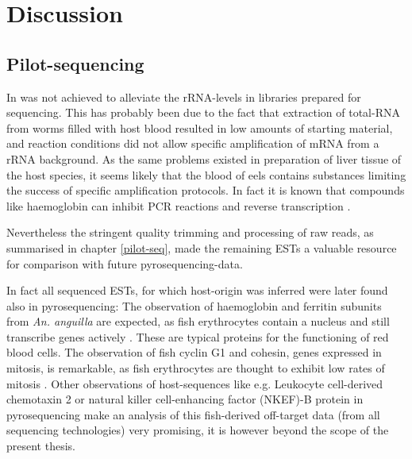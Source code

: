 
\chapter{Discussion} %



\ifpdf
    \graphicspath{{7_discussion/figures/PNG/}{7_discussion/figures/PDF/}{7_discussion/figures/}}
\else
    \graphicspath{{7_discussion/figures/EPS/}{7_discussion/figures/}}
\fi



\section{Pilot-sequencing}
\label{sec:sanger-pil}

In was not achieved to alleviate the rRNA-levels in libraries prepared
for sequencing. This has probably been due to the fact that extraction
of total-RNA from worms filled with host blood resulted in low amounts
of starting material, and reaction conditions did not allow specific
amplification of mRNA from a rRNA background. As the same problems
existed in preparation of liver tissue of the host species, it seems
likely that the blood of eels contains substances limiting the success
of specific amplification protocols. In fact it is known that
compounds like haemoglobin can inhibit PCR reactions
\cite{pmid9327537} and reverse transcription \cite{pmid16109794}.

Nevertheless the stringent quality trimming and processing of raw
reads, as summarised in chapter \ref{pilot-seq}, made the remaining
ESTs a valuable resource for comparison with future
pyrosequencing-data.

In fact all sequenced ESTs, for which host-origin was inferred were
later found also in pyrosequencing: The observation of haemoglobin and
ferritin subunits from \textit{An. anguilla} are expected, as fish
erythrocytes contain a nucleus and still transcribe genes actively
\cite{pmid20614118}. These are typical proteins for the functioning of
red blood cells. The observation of fish cyclin G1 and cohesin, genes
expressed in mitosis, is remarkable, as fish erythrocytes are thought
to exhibit low rates of mitosis \cite{pmid7506383}. Other observations
of host-sequences like e.g. Leukocyte cell-derived chemotaxin 2 or
natural killer cell-enhancing factor (NKEF)-B protein in
pyrosequencing make an analysis of this fish-derived off-target data
(from all sequencing technologies) very promising, it is however
beyond the scope of the present thesis.

